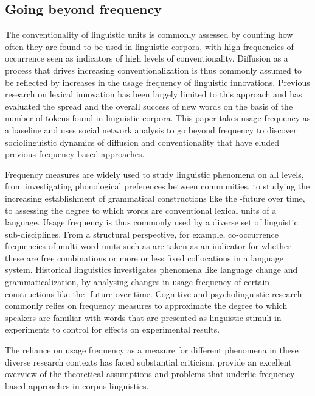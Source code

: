 \documentclass[a4paper, abstract=on]{scrartcl}
\begin{document}
  \subsection{Going beyond frequency}

    The conventionality of linguistic units is commonly assessed by counting how often they are found to be used in linguistic corpora, with high frequencies of occurrence seen as indicators of high levels of conventionality. Diffusion as a process that drives increasing conventionalization is thus commonly assumed to be reflected by increases in the usage frequency of linguistic innovations. Previous research on lexical innovation has been largely limited to this approach and has evaluated the spread and the overall success of new words on the basis of the number of tokens found in linguistic corpora. This paper takes usage frequency as a baseline and uses social network analysis to go beyond frequency to discover sociolinguistic dynamics of diffusion and conventionality that have eluded previous frequency-based approaches.

    Frequency measures are widely used to study linguistic phenomena on all levels, from investigating phonological preferences between communities, to studying the increasing establishment of grammatical constructions like the -future over time, to assessing the degree to which words are conventional lexical units of a language. Usage frequency is thus commonly used by a diverse set of linguistic sub-disciplines. From a structural perspective, for example, co-occurrence frequencies of multi-word units such as  are taken as an indicator for whether these are free combinations or more or less fixed collocations in a language system. Historical linguistics investigates phenomena like language change and grammaticalization, by analysing changes in usage frequency of certain constructions like the -future over time. Cognitive and psycholinguistic research commonly relies on frequency measures to approximate the degree to which speakers are familiar with words that are presented as linguistic stimuli in experiments to control for effects on experimental results.

    The reliance on usage frequency as a measure for different phenomena in these diverse research contexts has faced substantial criticism. \cite{Stefanowitsch2017} provide an excellent overview of the theoretical assumptions and problems that underlie frequency-based approaches in corpus linguistics.
\end{document}
